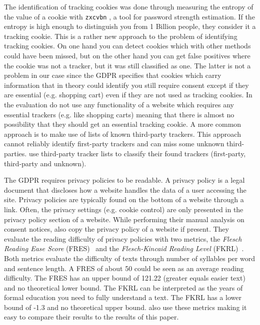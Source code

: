The identification of tracking cookies was done through measuring the entropy of the value of a cookie with
\texttt{zxcvbn} \cite{wheeler2016zxcvbn}, a tool for password strength estimation.
If the entropy is high enough to distinguish you from 1 Billion people, they
consider it a tracking cookie. This is a rather new approach to the problem of identifying tracking cookies.
On one hand you can detect cookies which with other methods could have been missed, but on the other hand you can get false positives
where the cookie was not a tracker, but it was still classified as one. The latter is not a problem in our case since the
GDPR specifies that cookies which carry information that in theory could identify you still require consent except if
they are essential (e.g. shopping cart) even if they are not used as tracking cookies. In the evaluation
\citeauthor{sanchez2019can} do not use any functionality of a
website which requires any essential trackers (e.g. like shopping carts) meaning that there is almost no possibility
that they should get an essential tracking cookie.
A more common approach is to make use of lists of known third-party trackers. This approach cannot reliably identify
first-party trackers and can miss some unknown third-parties. \citeauthor{sanchez2019can} use third-party tracker lists
to classify their found trackers (first-party, third-party and unknown).

The GDPR requires privacy policies to be readable. A privacy policy is a legal document that discloses how
a website handles the data of a user accessing the site. Privacy policies are typically found on the bottom
of a website through a link. Often, the privacy settings (e.g. cookie control) are only presented
in the privacy policy section of a website. While performing their manual analysis on consent notices,
\citeauthor{sanchez2019can} also copy the privacy policy of a website if present. They evaluate the reading difficulty of
privacy policies with
two metrics, the \emph{Flesch Reading Ease Score} (FRES)~\cite{flesch1948new} and the \emph{Flesch-Kincaid Reading
Level} (FKRL)~\cite{kincaid1975derivation}. Both metrics evaluate the difficulty of texts through number of syllables
per word and sentence length. A FRES of about 50 could be seen as an average reading difficulty. The FRES has an upper
bound of 121.22 (greater equals easier text) and no theoretical lower bound. The FKRL can be interpreted as the years of
formal education you need to fully understand a text. The FKRL has a lower bound of -1.3 and no
theoretical upper bound.  also use these metrics making it easy to compare their results to the
results of this paper.


